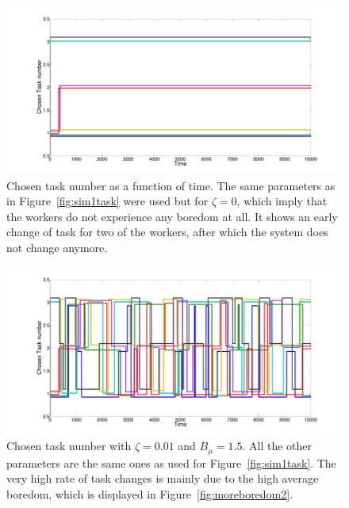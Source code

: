 \begin{figure}[h!]
	\centering
	\includegraphics[width=\textwidth]{../figures/noboredom.pdf}
	\caption{Chosen task number as a function of time. The same parameters as in Figure~\ref{fig:sim1task} were used but for $\zeta=0$, which imply that the workers do not experience any boredom at all. It shows an early change of task for two of the workers, after which the system does not change anymore.}
	\label{fig:noboredom}
\end{figure}

\begin{figure}[h!]
	\centering
	\includegraphics[width=\textwidth]{../figures/moreboredom1.pdf}
	\caption{Chosen task number with $\zeta=0.01$ and $B_\mu=1.5$. All the other parameters are the same ones as used for Figure~\ref{fig:sim1task}. The very high rate of task changes is mainly due to the high average boredom, which is displayed in Figure~\ref{fig:moreboredom2}.}
	\label{fig:moreboredom1}
\end{figure}

